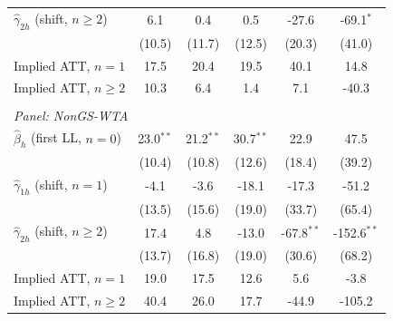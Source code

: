 \begin{tabular}{l*{5}{c}}
$\hat{\gamma}_{2h}$ (shift, $n\geq 2$) & 6.1 & 0.4 & 0.5 & -27.6 & -69.1$^{*}$ \\
 & (10.5) & (11.7) & (12.5) & (20.3) & (41.0) \\
Implied ATT, $n=1$ & 17.5 & 20.4 & 19.5 & 40.1 & 14.8 \\
Implied ATT, $n\geq 2$ & 10.3 & 6.4 & 1.4 & 7.1 & -40.3 \\
\\[0.3em]
\multicolumn{6}{l}{\textit{Panel: NonGS-WTA}} \\ \midrule
$\hat{\beta}_h$ (first LL, $n=0$) & 23.0$^{**}$ & 21.2$^{**}$ & 30.7$^{**}$ & 22.9 & 47.5 \\
 & (10.4) & (10.8) & (12.6) & (18.4) & (39.2) \\
$\hat{\gamma}_{1h}$ (shift, $n=1$) & -4.1 & -3.6 & -18.1 & -17.3 & -51.2 \\
 & (13.5) & (15.6) & (19.0) & (33.7) & (65.4) \\
$\hat{\gamma}_{2h}$ (shift, $n\geq 2$) & 17.4 & 4.8 & -13.0 & -67.8$^{**}$ & -152.6$^{**}$ \\
 & (13.7) & (16.8) & (19.0) & (30.6) & (68.2) \\
Implied ATT, $n=1$ & 19.0 & 17.5 & 12.6 & 5.6 & -3.8 \\
Implied ATT, $n\geq 2$ & 40.4 & 26.0 & 17.7 & -44.9 & -105.2 \\
\bottomrule
\end{tabular}

